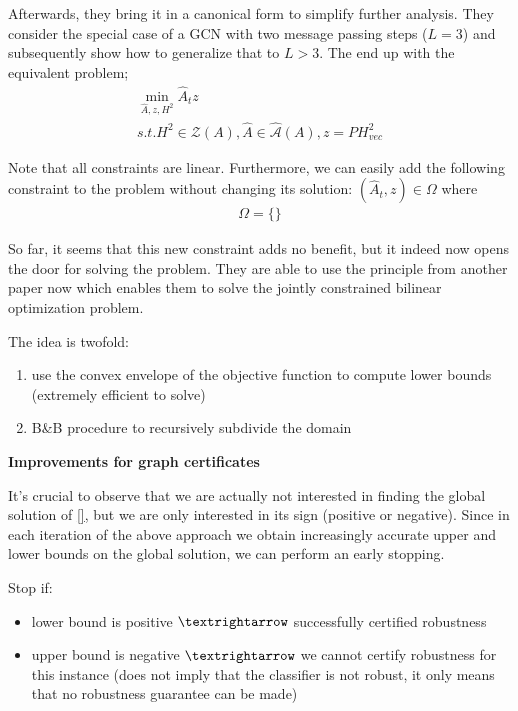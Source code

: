 \documentclass[a4paper,preprint]{sig-alternate}
\begin{document}
Afterwards, they bring it in a canonical form to simplify further analysis. They consider the special case
of a GCN with two message passing steps ($L=3$) and subsequently show how to generalize that to $L>3$.
The end up with the equivalent problem;
\begin{gather}
    \min_{\hat{A}, z, H^2} \hat{A}_t z \\
    s.t. H^2 \in \mathcal{Z}(A), \hat{A} \in \mathcal{\hat{A}}(A), z = PH_{vec}^2
\end{gather}

Note that all constraints are linear. Furthermore, we can easily add the following constraint to the problem
without changing its solution: $(\hat{A}_t, z) \in \Omega$ where
\begin{gather}
    \Omega = \{\}
\end{gather}

So far, it seems that this new constraint adds no benefit, but it indeed now opens the door for solving the problem.
They are able to use the principle from another paper now which enables them to solve the jointly constrained
bilinear optimization problem.\newline

The idea is twofold:
\begin{enumerate}
    \item use the convex envelope of the objective function to compute lower bounds (extremely efficient to solve)
    \item B\&B procedure to recursively subdivide the domain
\end{enumerate}

\textbf{Improvements for graph certificates}\newline

It's crucial to observe that we are actually not interested in finding the global solution of \ref{}, but we are only
interested in its sign (positive or negative). Since in each iteration of the above approach we obtain increasingly accurate
upper and lower bounds on the global solution, we can perform an early stopping.\newline

Stop if:
\begin{itemize}
    \item lower bound is positive $\textrightarrow$ successfully certified robustness
    \item upper bound is negative $\textrightarrow$ we cannot certify robustness for this instance (does not imply that the classifier is not robust,
    it only means that no robustness guarantee can be made)
\end{itemize}
\end{document}
